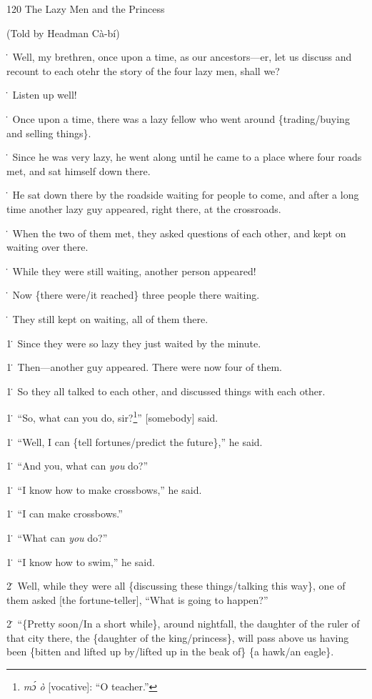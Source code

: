 
120 The Lazy Men and the Princess

(Told by Headman Cà-bí)

\. Well, my brethren, once upon a time, as our ancestors---er, let us discuss and
recount to each otehr the story of the four lazy men, shall we?

\. Listen up well!

\. Once upon a time, there was a lazy fellow who went around \{trading/buying and
selling things\}.

\. Since he was very lazy, he went along until he came to a place where four roads
met, and sat himself down there.

\. He sat down there by the roadside waiting for people to come, and after a long
time another lazy guy appeared, right there, at the crossroads.

\. When the two of them met, they asked questions of each other, and kept on waiting
over there.

\. While they were still waiting, another person appeared!

\. Now \{there were/it reached\} three people there waiting.

\. They still kept on waiting, all of them there.

1\. Since they were so lazy they just waited by the minute.

1\. Then---another guy appeared. There were now four of them.

1\. So they all talked to each other, and discussed things with each other.

1\. ``So, what can you do, sir?\footnote{\textit{mɔ́ ò }[vocative]: ``O teacher.''}'' [somebody] said.

1\. ``Well, I can \{tell fortunes/predict the future\},'' he said.

1\. ``And you, what can \textit{you} do?''

1\. ``I know how to make crossbows,'' he said.

1\. ``I can make crossbows.''

1\. ``What can \textit{you} do?''

1\. ``I know how to swim,'' he said.

2\. Well, while they were all \{discussing these things/talking this way\}, one
of them asked [the fortune-teller], ``What is going to happen?''

2\. ``\{Pretty soon/In a short while\}, around nightfall, the daughter of the ruler
of that city there, the \{daughter of the king/princess\}, will pass above us having
been \{bitten and lifted up by/lifted up in the beak of\} \{a hawk/an eagle\}.

